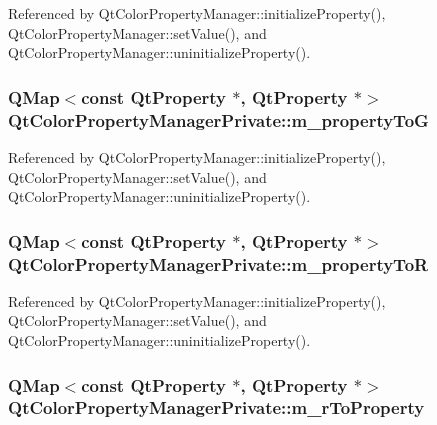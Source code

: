Referenced by Qt\+Color\+Property\+Manager\+::initialize\+Property(), Qt\+Color\+Property\+Manager\+::set\+Value(), and Qt\+Color\+Property\+Manager\+::uninitialize\+Property().

\subsubsection[{m\+\_\+property\+ToG}]{\setlength{\rightskip}{0pt plus 5cm}Q\+Map$<$const {\bf Qt\+Property} $\ast$, {\bf Qt\+Property} $\ast$$>$ Qt\+Color\+Property\+Manager\+Private\+::m\+\_\+property\+ToG}\label{classQtColorPropertyManagerPrivate_a4bebce215946c5a20fb2a8d2d4d6bb67}


Referenced by Qt\+Color\+Property\+Manager\+::initialize\+Property(), Qt\+Color\+Property\+Manager\+::set\+Value(), and Qt\+Color\+Property\+Manager\+::uninitialize\+Property().

\subsubsection[{m\+\_\+property\+ToR}]{\setlength{\rightskip}{0pt plus 5cm}Q\+Map$<$const {\bf Qt\+Property} $\ast$, {\bf Qt\+Property} $\ast$$>$ Qt\+Color\+Property\+Manager\+Private\+::m\+\_\+property\+ToR}\label{classQtColorPropertyManagerPrivate_a1f3e1e46618dbaed652bafb26ecec581}


Referenced by Qt\+Color\+Property\+Manager\+::initialize\+Property(), Qt\+Color\+Property\+Manager\+::set\+Value(), and Qt\+Color\+Property\+Manager\+::uninitialize\+Property().

\subsubsection[{m\+\_\+r\+To\+Property}]{\setlength{\rightskip}{0pt plus 5cm}Q\+Map$<$const {\bf Qt\+Property} $\ast$, {\bf Qt\+Property} $\ast$$>$ Qt\+Color\+Property\+Manager\+Private\+::m\+\_\+r\+To\+Property}\label{classQtColorPropertyManagerPrivate_aee66514585df37b1dc8a63dbe4b81d00}


